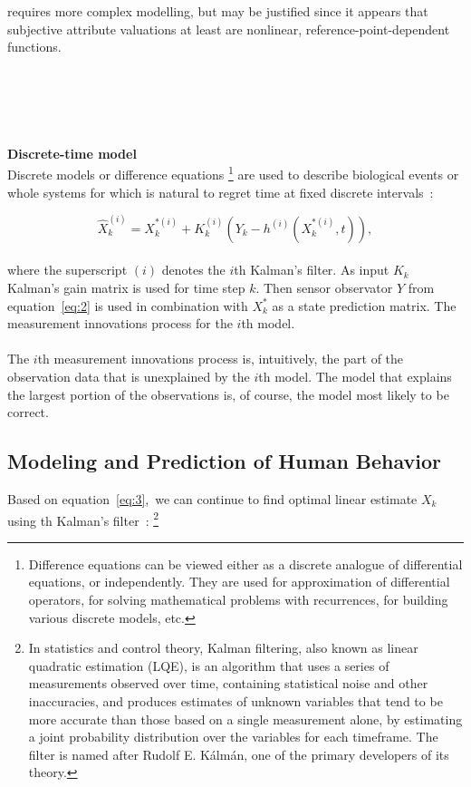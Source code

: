 requires more complex modelling, but may be justified since it appears that subjective attribute valuations at least are nonlinear, reference-point-dependent functions.\\
\\
\\
\\
\\
\\
\textbf{Discrete-time model} \label{subsec:discrete}\\
Discrete models or difference equations \footnote{Difference equations can be viewed either as a discrete analogue of differential equations, or independently.
They are used for approximation of differential operators, for solving mathematical problems with recurrences, for building various discrete
models, etc.} are used to describe biological events or whole systems for which is natural to regret time at fixed discrete intervals~\cite{pantland}:

\begin{equation} \label{eq:3}
\hat{X}_{k}^{(i)} = X_{k}^{*(i)} + K_k^{(i)}(Y_k - h^{(i)}(X_{k}^{*(i)},t)),
\end{equation}
\\
where the superscript $(i)$ denotes the $i$th Kalman's filter.
As input $K_k$ Kalman's gain matrix is used for time step $k$.
Then sensor observator $Y$ from equation~\ref{eq:2} is used in combination with $X_{k}^{*}$ as a state prediction matrix.
The measurement innovations process for the $i$th model.\\
\\
The $i$th measurement innovations process is, intuitively, the part of the observation data that is unexplained by the $i$th model.
The model that explains the largest portion of the observations is, of course, the model most likely to be correct.\\

\subsection{Modeling and Prediction of Human Behavior} \label{subsec:prediction}
Based on equation~\ref{eq:3},\ we can continue to find optimal linear estimate $X_k$ using th Kalman's filter~\cite{pantland}: \footnote{In statistics
and control theory, Kalman filtering, also known as linear quadratic estimation (LQE), is an algorithm that
uses a series of measurements observed over time, containing statistical noise and other inaccuracies, and produces
estimates of unknown variables that tend to be more accurate than those based on a single measurement alone, by estimating
a joint probability distribution over the variables for each timeframe.
The filter is named after Rudolf E. Kálmán, one of the primary developers of its theory.}

